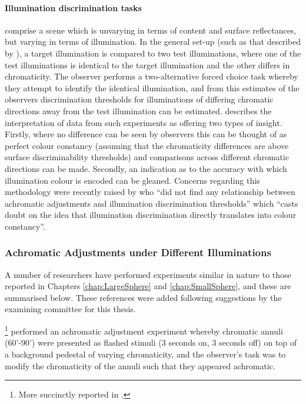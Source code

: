 \paragraph{Illumination discrimination tasks} comprise a scene which is unvarying in terms of content and surface reflectances, but varying in terms of illumination. In the general set-up (such as that described by \citet{pearce_chromatic_2014}), a target illumination is compared to two test illuminations, where one of the test illuminations is identical to the target illumination and the other differs in chromaticity. The observer performs a two-alternative forced choice task whereby they attempt to identify the identical illumination, and from this estimates of the observers discrimination thresholds for illuminations of differing chromatic directions away from the test illumination can be estimated. \citet{aston_illumination_2019} describes the interpretation of data from such experiments as offering two types of insight. Firstly, where no difference can be seen by observers this can be thought of as perfect colour constancy (assuming that the chromaticity differences are above surface discriminability thresholds) and comparisons across different chromatic directions can be made. Secondly, an indication as to the accuracy with which illumination colour is encoded can be gleaned. Concerns regarding this methodology were recently raised by \citet{weiss_determinants_2017} who ``did not find any relationship between achromatic adjustments and illumination discrimination thresholds'' which ``casts doubt on the idea that illumination discrimination directly translates into colour constancy''.

\subsubsection{Achromatic Adjustments under Different Illuminations} \label{sec:aadi}

A number of researchers have performed experiments similar in nature to those reported in Chapters \ref{chap:LargeSphere} and \ref{chap:SmallSphere}, and these are summarised below. These references were added following suggestions by the examining committee for this thesis.

\textbf{\citet{werner_effect_1982}}\footnote{More succinctly reported in \citet{walraven_chromatic_1982}.} performed an achromatic adjustment experiment whereby chromatic annuli (60'-90') were presented as flashed stimuli (3 seconds on, 3 seconds off) on top of a background pedestal of varying chromaticity, and the observer's task was to modify the chromaticity of the annuli such that they appeared achromatic. 

